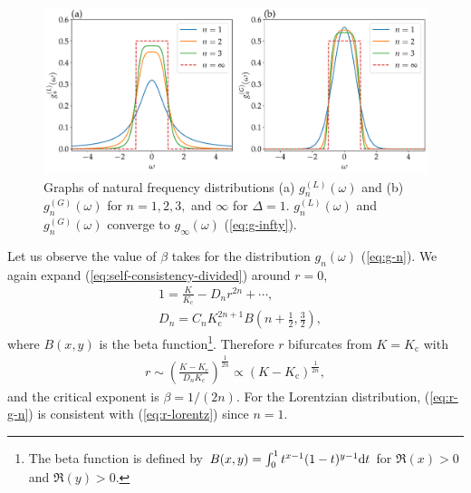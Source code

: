 \begin{figure}[thbp]
  \begin{center}
    \includegraphics[width=\textwidth]{figs/general_dist.pdf}
  \end{center}
  \caption{
    Graphs of natural frequency distributions (a) $g^{(L)}_{n}(\omega)$ and (b) $g^{(G)}_{n}(\omega)$
    for $n=1,2,3,$ and $\infty$ for $\Delta=1$.
    $g^{(L)}_{n}(\omega)$ and $g^{(G)}_{n}(\omega)$ converge to $g_{\infty}(\omega)$ (\ref{eq:g-infty}).
  }
  \label{fig:yoko-dist}
\end{figure}

Let us observe the value of $\beta$ takes
for the distribution $g_{n}(\omega)$ (\ref{eq:g-n}).
We again expand (\ref{eq:self-consistency-divided}) around $r=0$,
\begin{align}
  &1=\frac{K}{K_{\mathrm{c}}}-D_{n}r^{2n}+\cdots,\\
  &D_{n}=C_{n}K_{\mathrm{c}}^{2n+1}B\left(n+\frac{1}{2},\frac{3}{2}\right),
\end{align}
where $B(x,y)$ is the beta function\footnote{The beta function is defined by $B(x,y)=\int_{0}^{1}t^{x-1}(1-t)^{y-1}\mathrm{d} t$ for $\Re(x)>0$ and $\Re(y)>0$.}.
Therefore $r$ bifurcates from $K=K_{\mathrm{c}}$ with
\begin{align}
  r\sim\left(\frac{K-K_{\mathrm{c}}}{D_{n}K_{\mathrm{c}}}\right)^{\frac{1}{2n}}\propto(K-K_{\mathrm{c}})^{\frac{1}{2n}},
  \label{eq:r-g-n}
\end{align}
and the critical exponent is $\beta=1/(2n)$.
For the Lorentzian distribution,
(\ref{eq:r-g-n}) is consistent with (\ref{eq:r-lorentz}) since $n=1$.

